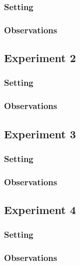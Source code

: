\documentclass[11pt]{article}
\begin{document}
\subsubsection{Setting}

\subsubsection{Observations}

\subsection{Experiment 2}

\subsubsection{Setting}

\subsubsection{Observations}

\subsection{Experiment 3}

\subsubsection{Setting}

\subsubsection{Observations}


\subsection{Experiment 4}

\subsubsection{Setting}

\subsubsection{Observations}
\end{document}

